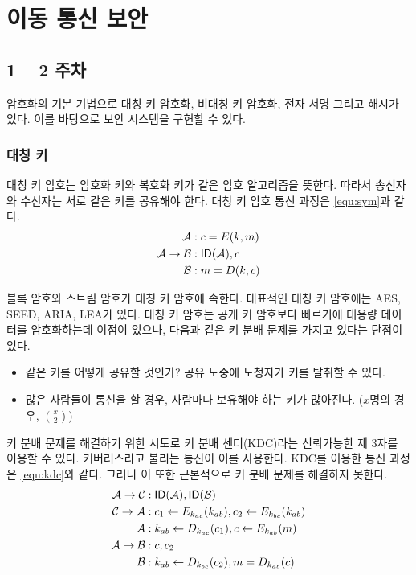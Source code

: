 \chapter{이동 통신 보안}

\section{1 ~ 2 주차}

암호화의 기본 기법으로 대칭 키 암호화, 비대칭 키 암호화, 전자 서명 그리고 해시가 있다.
이를 바탕으로 보안 시스템을 구현할 수 있다.

\subsection*{대칭 키}

대칭 키 암호는 암호화 키와 복호화 키가 같은 암호 알고리즘을 뜻한다. 따라서
송신자와 수신자는 서로 같은 키를 공유해야 한다. 대칭 키 암호 통신 과정은
\ref{equ:sym}과 같다.
\begin{equation}
  \begin{split}
    \mathcal{A}&: c = E(k, m) \\
    \mathcal{A} \to \mathcal{B}&: \textsf{ID}(\mathcal{A}), c \\
    \mathcal{B}&: m = D(k, c)
  \end{split}
  \label{equ:sym}
\end{equation}

블록 암호와 스트림 암호가 대칭 키 암호에 속한다. 대표적인 대칭 키 암호에는 AES,
SEED, ARIA, LEA가 있다. 대칭 키 암호는 공개 키 암호보다 빠르기에 대용량 데이터를
암호화하는데 이점이 있으나, 다음과 같은 키 분배 문제를 가지고 있다는 단점이
있다.
\begin{itemize}
  \item 같은 키를 어떻게 공유할 것인가? 공유 도중에 도청자가 키를 탈취할 수
        있다.
  \item 많은 사람들이 통신을 할 경우, 사람마다 보유해야 하는 키가 많아진다.
        ($x$명의 경우, $\binom{x}{2}$)
\end{itemize}

키 분배 문제를 해결하기 위한 시도로 키 분배 센터(KDC)라는 신뢰가능한 제 3자를
이용할 수 있다. 커버러스라고 불리는 통신이 이를 사용한다. KDC를 이용한 통신
과정은 \ref{equ:kdc}와 같다. 그러나 이 또한 근본적으로 키 분배 문제를 해결하지
못한다.
\begin{equation}
  \begin{split}
    \mathcal{A} \to \mathcal{C}&: \textsf{ID}(\mathcal{A}), \textsf{ID}(\mathcal{B}) \\
    \mathcal{C} \to \mathcal{A}&: c_1 \leftarrow E_{k_{ac}}(k_{ab}),
    c_2 \leftarrow E_{k_{bc}}(k_{ab}) \\
    \mathcal{A}&: k_{ab} \leftarrow D_{k_{ac}}(c_1),
    c \leftarrow E_{k_{ab}}(m) \\
    \mathcal{A} \to \mathcal{B}&: c, c_2 \\
    \mathcal{B}&: k_{ab} \leftarrow D_{k_{bc}}(c_2),
    m = D_{k_{ab}}(c).
  \end{split}
  \label{equ:kdc}
\end{equation}

